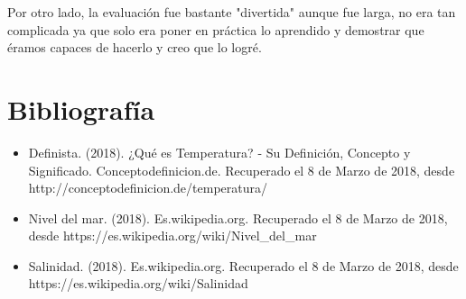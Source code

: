 \documentclass[12pt]{article}
\begin{document}
Por otro lado, la evaluación fue bastante "divertida" aunque fue larga, no era tan complicada ya que solo era poner en práctica lo aprendido y demostrar que éramos capaces de hacerlo y creo que lo logré.

\section*{Bibliografía}
\begin{itemize}
\item Definista. (2018). ¿Qué es Temperatura? - Su Definición, Concepto y Significado. Conceptodefinicion.de. Recuperado el 8 de Marzo de 2018, desde \\
http://conceptodefinicion.de/temperatura/
\item Nivel del mar. (2018). Es.wikipedia.org. Recuperado el 8 de Marzo de 2018, desde 
https://es.wikipedia.org/wiki/Nivel\_del\_mar
\item Salinidad. (2018). Es.wikipedia.org. Recuperado el 8 de Marzo de 2018, desde https://es.wikipedia.org/wiki/Salinidad
\end{itemize}
\end{document}
